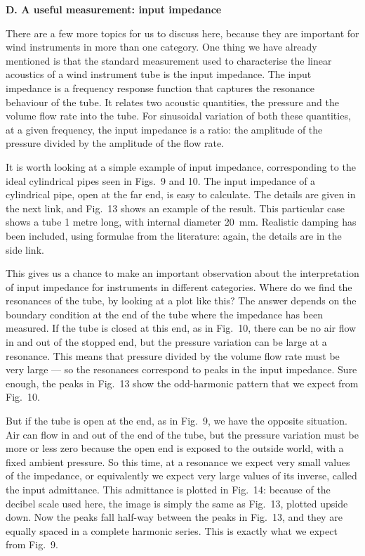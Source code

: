   \textbf{D. A useful measurement: input impedance} 

  There are a few more topics for us to discuss here, because they are 
  important for wind instruments in more than one category. One thing we have 
  already mentioned is that the standard measurement used to characterise the 
  linear acoustics of a wind instrument tube is the input impedance. The input 
  impedance is a frequency response function that captures the resonance 
  behaviour of the tube. It relates two acoustic quantities, the pressure and 
  the volume flow rate into the tube. For sinusoidal variation of both these 
  quantities, at a given frequency, the input impedance is a ratio: the 
  amplitude of the pressure divided by the amplitude of the flow rate. 

  It is worth looking at a simple example of input impedance, corresponding to 
  the ideal cylindrical pipes seen in Figs.\ 9 and 10. The input impedance of a 
  cylindrical pipe, open at the far end, is easy to calculate. The details are 
  given in the next link, and Fig.\ 13 shows an example of the result. This 
  particular case shows a tube 1 metre long, with internal diameter 20~mm. 
  Realistic damping has been included, using formulae from the literature: 
  again, the details are in the side link. 


  This gives us a chance to make an important observation about the 
  interpretation of input impedance for instruments in different categories. 
  Where do we find the resonances of the tube, by looking at a plot like this? 
  The answer depends on the boundary condition at the end of the tube where the 
  impedance has been measured. If the tube is closed at this end, as in Fig.\ 
  10, there can be no air flow in and out of the stopped end, but the pressure 
  variation can be large at a resonance. This means that pressure divided by 
  the volume flow rate must be very large — so the resonances correspond to 
  peaks in the input impedance. Sure enough, the peaks in Fig.\ 13 show the 
  odd-harmonic pattern that we expect from Fig.\ 10. 

  But if the tube is open at the end, as in Fig.\ 9, we have the opposite 
  situation. Air can flow in and out of the end of the tube, but the pressure 
  variation must be more or less zero because the open end is exposed to the 
  outside world, with a fixed ambient pressure. So this time, at a resonance we 
  expect very small values of the impedance, or equivalently we expect very 
  large values of its inverse, called the input admittance. This admittance is 
  plotted in Fig.\ 14: because of the decibel scale used here, the image is 
  simply the same as Fig.\ 13, plotted upside down. Now the peaks fall half-way 
  between the peaks in Fig.\ 13, and they are equally spaced in a complete 
  harmonic series. This is exactly what we expect from Fig.\ 9. 


